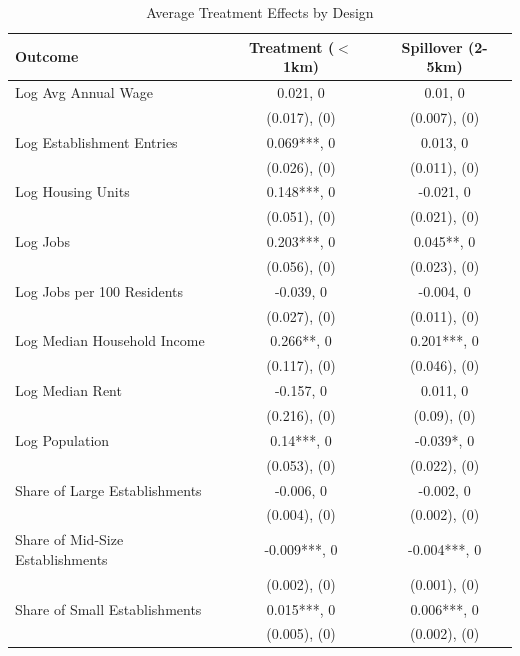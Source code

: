 \begin{table}[!h]
\centering
\caption{\label{tab:tab:att_results}Average Treatment Effects by Design}
\centering
\begin{tabular}[t]{lcc}
\toprule
Outcome & Treatment ($<$1km) & Spillover (2-5km)\\
\midrule
Log Avg Annual Wage & 0.021, 0 & 0.01, 0\\
 & (0.017), (0) & (0.007), (0)\\
Log Establishment Entries & 0.069***, 0 & 0.013, 0\\
 & (0.026), (0) & (0.011), (0)\\
Log Housing Units & 0.148***, 0 & -0.021, 0\\
\addlinespace
 & (0.051), (0) & (0.021), (0)\\
Log Jobs & 0.203***, 0 & 0.045**, 0\\
 & (0.056), (0) & (0.023), (0)\\
Log Jobs per 100 Residents & -0.039, 0 & -0.004, 0\\
 & (0.027), (0) & (0.011), (0)\\
\addlinespace
Log Median Household Income & 0.266**, 0 & 0.201***, 0\\
 & (0.117), (0) & (0.046), (0)\\
Log Median Rent & -0.157, 0 & 0.011, 0\\
 & (0.216), (0) & (0.09), (0)\\
Log Population & 0.14***, 0 & -0.039*, 0\\
\addlinespace
 & (0.053), (0) & (0.022), (0)\\
Share of Large Establishments & -0.006, 0 & -0.002, 0\\
 & (0.004), (0) & (0.002), (0)\\
Share of Mid-Size Establishments & -0.009***, 0 & -0.004***, 0\\
 & (0.002), (0) & (0.001), (0)\\
\addlinespace
Share of Small Establishments & 0.015***, 0 & 0.006***, 0\\
 & (0.005), (0) & (0.002), (0)\\
\bottomrule
\end{tabular}
\end{table}

